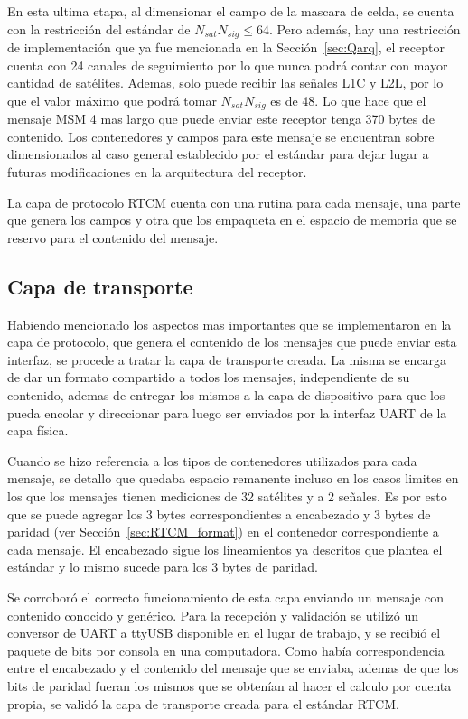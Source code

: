 \documentclass[a4paper,12pt,oneside,onecolumn,final,openright]{book}%
\begin{document}
	En esta ultima etapa, al dimensionar el campo de la mascara de celda, se cuenta con la restricción del estándar de $N_{sat}N_{sig}\leq 64$. Pero además, hay una restricción de implementación que ya fue mencionada en la Sección~\ref{sec:Qarq}, el receptor cuenta con 24 canales de seguimiento por lo que nunca podrá contar con mayor cantidad de satélites. Ademas, solo puede recibir las señales L1C y L2L, por lo que el valor máximo que podrá tomar $N_{sat}N_{sig}$ es de 48. Lo que hace que el mensaje MSM 4 mas largo que puede enviar este receptor tenga 370 bytes de contenido. Los contenedores y campos para este mensaje se encuentran sobre dimensionados al caso general establecido por el estándar para dejar lugar a futuras modificaciones en la arquitectura del receptor.
	
	La capa de protocolo RTCM cuenta con una rutina para cada mensaje, una parte que genera los campos y otra que los empaqueta en el espacio de memoria que se reservo para el contenido del mensaje. 
\subsection{Capa de transporte}
	Habiendo mencionado los aspectos mas importantes que se implementaron en la capa de protocolo, que genera el contenido de los mensajes que puede enviar esta interfaz, se procede a tratar la capa de transporte creada. La misma se encarga de dar un formato compartido a todos los mensajes, independiente de su contenido, ademas de entregar los mismos a la capa de dispositivo para que los pueda encolar y direccionar para luego ser enviados por la interfaz UART de la capa física.
	
	Cuando se hizo referencia a los tipos de contenedores utilizados para cada mensaje, se detallo que quedaba espacio remanente incluso en los casos limites en los que los mensajes tienen mediciones de 32 satélites y a 2 señales. Es por esto que se puede agregar los 3 bytes correspondientes a encabezado y 3 bytes de paridad (ver Sección~\ref{sec:RTCM_format}) en el contenedor correspondiente a cada mensaje. El encabezado sigue los lineamientos ya descritos que plantea el estándar y lo mismo sucede para los 3 bytes de paridad.
	
	Se corroboró el correcto funcionamiento de esta capa enviando un mensaje con contenido conocido y genérico. Para la recepción y validación se utilizó un conversor de UART a ttyUSB disponible en el lugar de trabajo, y se recibió el paquete de bits por consola en una computadora. Como había correspondencia entre el encabezado y el contenido del mensaje que se enviaba, ademas de que los bits de paridad fueran los mismos que se obtenían al hacer el calculo por cuenta propia, se validó la capa de transporte creada para el estándar RTCM.
\end{document}
